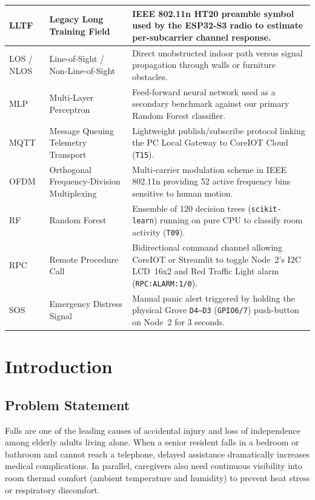 \documentclass{hcmut-report}
\begin{document}
\begin{table}[H]
\begin{tabularx}{\textwidth}{|P{2.2cm}|P{4.7cm}|Y|}
\hline
LLTF & Legacy Long Training Field & IEEE 802.11n HT20 preamble symbol used by the ESP32-S3 radio to estimate per-subcarrier channel response. \\
\hline
LOS / NLOS & Line-of-Sight / Non-Line-of-Sight & Direct unobstructed indoor path versus signal propagation through walls or furniture obstacles. \\
\hline
MLP & Multi-Layer Perceptron & Feed-forward neural network used as a secondary benchmark against our primary Random Forest classifier. \\
\hline
MQTT & Message Queuing Telemetry Transport & Lightweight publish/subscribe protocol linking the PC Local Gateway to CoreIOT Cloud (\texttt{T15}). \\
\hline
OFDM & Orthogonal Frequency-Division Multiplexing & Multi-carrier modulation scheme in IEEE 802.11n providing 52 active frequency bins sensitive to human motion. \\
\hline
RF & Random Forest & Ensemble of 120 decision trees (\texttt{scikit-learn}) running on pure CPU to classify room activity (\texttt{T09}). \\
\hline
RPC & Remote Procedure Call & Bidirectional command channel allowing CoreIOT or Streamlit to toggle Node~2's I2C LCD~16x2 and Red Traffic Light alarm (\texttt{RPC:ALARM:1/0}). \\
\hline
SOS & Emergency Distress Signal & Manual panic alert triggered by holding the physical Grove \texttt{D4--D3} (\texttt{GPIO6/7}) push-button on Node~2 for 3 seconds. \\
\hline
\end{tabularx}
\end{table}

\newpage

\section{Introduction}

\subsection{Problem Statement}
Falls are one of the leading causes of accidental injury and loss of independence among elderly adults living alone. When a senior resident falls in a bedroom or bathroom and cannot reach a telephone, delayed assistance dramatically increases medical complications. In parallel, caregivers also need continuous visibility into room thermal comfort (ambient temperature and humidity) to prevent heat stress or respiratory discomfort.
\end{document}
